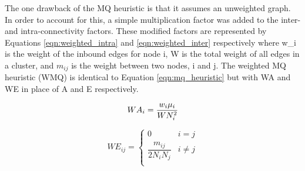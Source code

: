 The one drawback of the MQ heuristic is that it assumes an unweighted graph. In order to account for this, a simple multiplication factor was added to the inter- and intra-connectivity factors. These modified factors are represented by Equations \ref{eqn:weighted_intra} and \ref{eqn:weighted_inter} respectively where w\_i is the weight of the inbound edges for node i, W is the total weight of all edges in a cluster, and $m_{ij}$ is the weight between two nodes, i and j. The weighted MQ heuristic (WMQ) is identical to Equation \ref{eqn:mq_heuristic} but with WA and WE in place of A and E respectively.

\begin{equation}
    WA_i = \dfrac{w_i\mu_i}{WN_i^2} \\
    \label{eqn:weighted_intra}
\end{equation}

\begin{equation}
    WE_{ij} =
    \begin{cases}
        0 & i = j \\
        \dfrac{m_{ij}}{2N_iN_j} & i \ne j \\
    \end{cases}
    \label{eqn:weighted_inter}
\end{equation}

